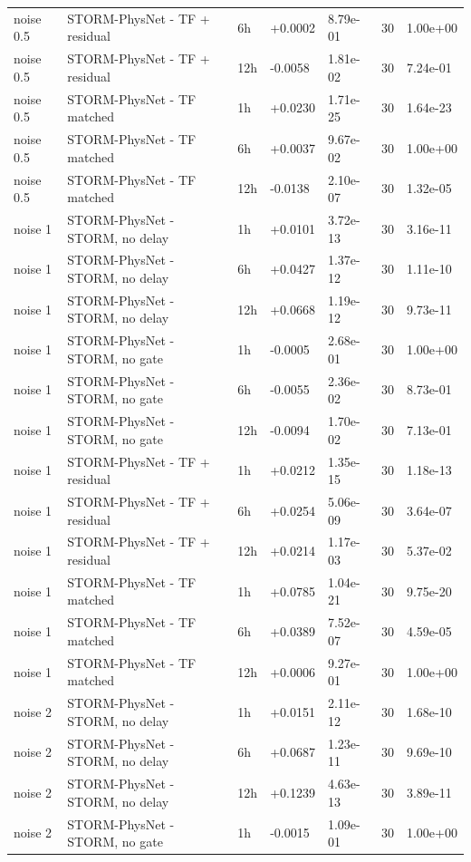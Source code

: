 \begin{tabular}{lllllrl}
noise 0.5 & STORM-PhysNet - TF + residual & 6h & +0.0002 & 8.79e-01 & 30 & 1.00e+00 \\
noise 0.5 & STORM-PhysNet - TF + residual & 12h & -0.0058 & 1.81e-02 & 30 & 7.24e-01 \\
noise 0.5 & STORM-PhysNet - TF matched & 1h & +0.0230 & 1.71e-25 & 30 & 1.64e-23 \\
noise 0.5 & STORM-PhysNet - TF matched & 6h & +0.0037 & 9.67e-02 & 30 & 1.00e+00 \\
noise 0.5 & STORM-PhysNet - TF matched & 12h & -0.0138 & 2.10e-07 & 30 & 1.32e-05 \\
noise 1 & STORM-PhysNet - STORM, no delay & 1h & +0.0101 & 3.72e-13 & 30 & 3.16e-11 \\
noise 1 & STORM-PhysNet - STORM, no delay & 6h & +0.0427 & 1.37e-12 & 30 & 1.11e-10 \\
noise 1 & STORM-PhysNet - STORM, no delay & 12h & +0.0668 & 1.19e-12 & 30 & 9.73e-11 \\
noise 1 & STORM-PhysNet - STORM, no gate & 1h & -0.0005 & 2.68e-01 & 30 & 1.00e+00 \\
noise 1 & STORM-PhysNet - STORM, no gate & 6h & -0.0055 & 2.36e-02 & 30 & 8.73e-01 \\
noise 1 & STORM-PhysNet - STORM, no gate & 12h & -0.0094 & 1.70e-02 & 30 & 7.13e-01 \\
noise 1 & STORM-PhysNet - TF + residual & 1h & +0.0212 & 1.35e-15 & 30 & 1.18e-13 \\
noise 1 & STORM-PhysNet - TF + residual & 6h & +0.0254 & 5.06e-09 & 30 & 3.64e-07 \\
noise 1 & STORM-PhysNet - TF + residual & 12h & +0.0214 & 1.17e-03 & 30 & 5.37e-02 \\
noise 1 & STORM-PhysNet - TF matched & 1h & +0.0785 & 1.04e-21 & 30 & 9.75e-20 \\
noise 1 & STORM-PhysNet - TF matched & 6h & +0.0389 & 7.52e-07 & 30 & 4.59e-05 \\
noise 1 & STORM-PhysNet - TF matched & 12h & +0.0006 & 9.27e-01 & 30 & 1.00e+00 \\
noise 2 & STORM-PhysNet - STORM, no delay & 1h & +0.0151 & 2.11e-12 & 30 & 1.68e-10 \\
noise 2 & STORM-PhysNet - STORM, no delay & 6h & +0.0687 & 1.23e-11 & 30 & 9.69e-10 \\
noise 2 & STORM-PhysNet - STORM, no delay & 12h & +0.1239 & 4.63e-13 & 30 & 3.89e-11 \\
noise 2 & STORM-PhysNet - STORM, no gate & 1h & -0.0015 & 1.09e-01 & 30 & 1.00e+00 \\

\end{tabular}
